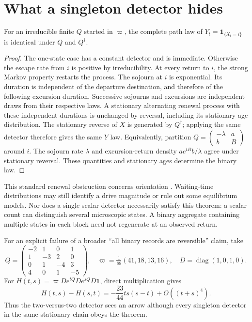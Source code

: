 \section{What a singleton detector hides}

\begin{theorem}
\label{thm:continuous-singleton}
For an irreducible finite $Q$ started in $\varpi$, the complete path law of
$Y_t=\mathbf1_{\{X_t=i\}}$ is identical under $Q$ and $Q^\dagger$.
\end{theorem}
\begin{proof}
The one-state case has a constant detector and is immediate. Otherwise the
escape rate from $i$ is positive by irreducibility.
At every return to $i$, the strong Markov property restarts the process.
The sojourn at $i$ is exponential. Its duration is independent of the
departure destination, and therefore of the following excursion duration.
Successive sojourns and excursions are independent draws from their respective
laws. A stationary alternating renewal process with these independent
durations is unchanged by reversal, including its stationary age distribution.
The stationary reverse of $X$ is generated by $Q^\dagger$; applying the same
detector therefore gives the same $Y$ law. Equivalently, partition
$Q=\left(\begin{smallmatrix}-\lambda&a\\b&B\end{smallmatrix}\right)$ around
$i$. The sojourn rate $\lambda$ and excursion-return density
$a e^{tB}b/\lambda$ agree under stationary reversal. These quantities and
stationary ages determine the binary law.
\end{proof}

This standard renewal obstruction concerns orientation
\cite{physics-lucente}. Waiting-time distributions may still identify a drive
magnitude or rule out some equilibrium models. Nor does a single scalar
detector necessarily satisfy this theorem: a scalar count can distinguish
several microscopic states. A binary aggregate containing multiple states in
each block need not regenerate at an observed return.

For an explicit failure of a broader ``all binary records are reversible''
claim, take
\begin{equation}
 Q=\begin{pmatrix}-2&1&0&1\\1&-3&2&0\\0&1&-4&3\\4&0&1&-5\end{pmatrix},
 \quad \varpi=\tfrac1{88}(41,18,13,16),\quad
 D=\operatorname{diag}(1,0,1,0).
\end{equation}
For $H(t,s)=\varpi D e^{tQ}D e^{sQ}D\mathbf1$, direct multiplication gives
\begin{equation}
 H(t,s)-H(s,t)=-\frac{23}{44}ts(s-t)+O((t+s)^4).
 \label{eq:continuous-aggregate}
\end{equation}
Thus the two-versus-two detector sees an arrow although every singleton
detector in the same stationary chain obeys the theorem.

